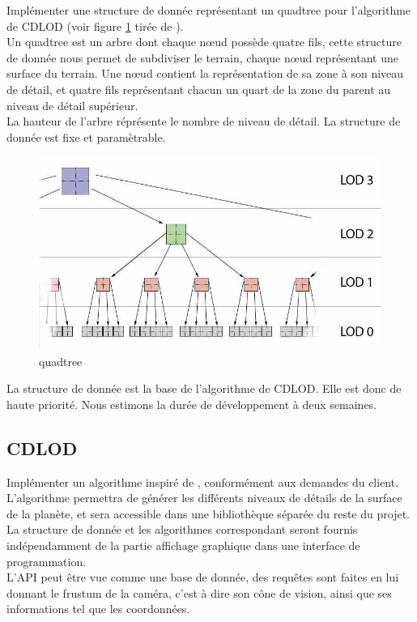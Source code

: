 \documentclass[12pt]{report}
\begin{document}
Implémenter une structure de donnée représentant un quadtree pour
l'algorithme de CDLOD (voir figure \ref{fig:quadtree} tirée de 
\cite{CDLOD}).\\
Un quadtree est un arbre dont chaque nœud possède quatre fils, cette
structure de donnée nous permet de subdiviser le terrain, chaque nœud
représentant une surface du terrain. Une nœud contient la représentation
de sa zone à son niveau de détail, et quatre fils représentant chacun un
quart de la zone du parent au niveau de détail supérieur.\\
La hauteur de l'arbre réprésente le nombre de niveau de détail.
La structure de donnée est fixe et paramètrable.
\begin{center}
\begin{figure}[!h]
  \includegraphics[scale=0.5]{img/Quadtree.png}
  \caption{quadtree \cite{CDLOD}}
  \label{fig:quadtree}
\end{figure}
\end{center}

La structure de donnée est la base de l'algorithme de CDLOD. Elle est
donc de haute priorité. Nous estimons la durée de développement à deux
semaines.\\

\subsection{CDLOD}

Implémenter un algorithme inspiré de \cite{CDLOD}, conformément aux
demandes du client.  L'algorithme permettra de générer les différents
niveaux de détails de la surface de la planète, et sera accessible dans
une bibliothèque séparée du reste du projet. La structure de donnée et
les algorithmes correspondant seront fournis indépendamment de la partie
affichage graphique dans une interface de programmation.\\
L'API peut être vue comme une base de donnée, des requêtes sont faites
en lui donnant le frustum de la caméra, c'est à dire son cône de vision,
ainsi que ses informations tel que les coordonnées.
\end{document}
